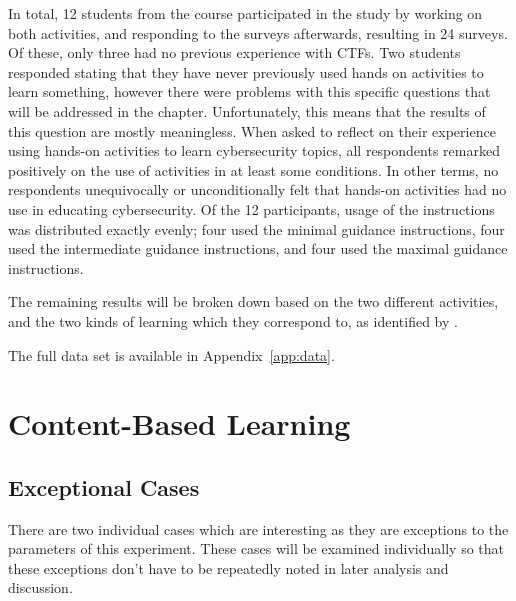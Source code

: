 In total, 12 students from the course participated in the study by working on both activities, and responding to the surveys afterwards, resulting in 24 surveys. %
Of these, only three had no previous experience with CTFs. %
Two students responded stating that they have never previously used hands on activities to learn something, however there were problems with this specific questions that will be addressed in the  chapter. %
Unfortunately, this means that the results of this question are mostly meaningless. %
When asked to reflect on their experience using hands-on activities to learn cybersecurity topics, all respondents remarked positively on the use of activities in at least some conditions. %
In other terms, no respondents unequivocally or unconditionally felt that hands-on activities had no use in educating cybersecurity. %
Of the 12 participants, usage of the instructions was distributed exactly evenly; %
four used the minimal guidance instructions, four used the intermediate guidance instructions, and four used the maximal guidance instructions. 

The remaining results will be broken down based on the two different activities, and the two kinds of learning which they correspond to, as identified by \textcite{R-Weiss}. 

The full data set is available in Appendix~\ref{app:data}.

    
        


        
        











\section{Content-Based Learning}
    \subsection{Exceptional Cases}
        There are two individual cases which are interesting as they are exceptions to the parameters of this experiment. %
These cases will be examined individually so that these exceptions don't have to be repeatedly noted in later analysis and discussion. 


